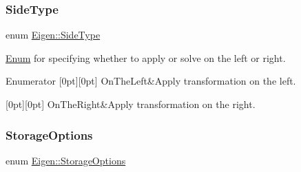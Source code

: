 \subsubsection{\texorpdfstring{SideType}{SideType}}
{\footnotesize\ttfamily enum \mbox{\hyperlink{group__enums_gac22de43beeac7a78b384f99bed5cee0b}{Eigen\+::\+Side\+Type}}}

\mbox{\hyperlink{struct_enum}{Enum}} for specifying whether to apply or solve on the left or right. \begin{DoxyEnumFields}{Enumerator}
[0pt][0pt]{}\mbox{\label{group__enums_ggac22de43beeac7a78b384f99bed5cee0ba21b30a61e9cb10c967aec17567804007}} 
On\+The\+Left&Apply transformation on the left. \\
\hline

[0pt][0pt]{}\mbox{\label{group__enums_ggac22de43beeac7a78b384f99bed5cee0ba329fc3a54ceb2b6e0e73b400998b8a82}} 
On\+The\+Right&Apply transformation on the right. \\
\hline

\end{DoxyEnumFields}
\mbox{\label{group__enums_gaacded1a18ae58b0f554751f6cdf9eb13}} 
\subsubsection{\texorpdfstring{StorageOptions}{StorageOptions}}
{\footnotesize\ttfamily enum \mbox{\hyperlink{group__enums_gaacded1a18ae58b0f554751f6cdf9eb13}{Eigen\+::\+Storage\+Options}}}

